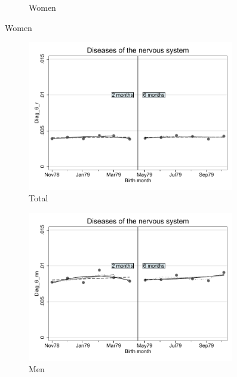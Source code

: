 \documentclass[a4paper ]{article}
\begin{document}
\begin{figure}[h!]
\begin{subfigure}[t]{0.31\textwidth}
		\caption{Women}
	\end{subfigure}
\end{figure}
\newpage
\begin{figure}[h]
	\centering
	\begin{subfigure}[t]{0.31\textwidth}
		\centering
		\includegraphics[width=0.99\textwidth]{R1_RD_Diag_6_r_fits}
		\caption{Total}		
	\end{subfigure}
	\begin{subfigure}[t]{0.31\textwidth}
		\centering
		\includegraphics[width=0.99\textwidth]{R1_RD_Diag_6_rm_fits}
		\caption{Men}		
	\end{subfigure}
	\quad
	\begin{subfigure}[t]{0.31\textwidth}

\end{subfigure}
\end{figure}
\end{document}
